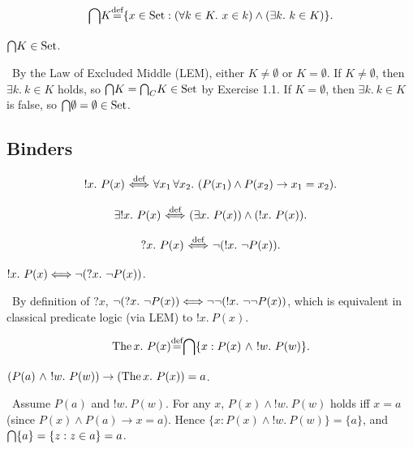 \documentclass[10pt,a4paper]{article}
\begin{document}
\begin{definition}
$${\bigcap} K {\stackrel{{\textrm{def}}}{=}} \{x \in {\textrm{Set}} : (\forall k\in K.\ x\in k)\land (\exists k.\ k\in K)\}.$$
\end{definition}

\begin{exercise}
${\bigcap} K \in {\textrm{Set}}$.
\end{exercise}
\myprf\ By the Law of Excluded Middle (LEM), either $K \neq \emptyset$ or $K = \emptyset$. If $K \neq \emptyset$, then $\exists k.\ k \in K$ holds, so ${\bigcap} K = {{\bigcap}_C} K \in {\textrm{Set}}$ by Exercise 1.1. If $K = \emptyset$, then $\exists k.\ k \in K$ is false, so ${\bigcap} \emptyset = \emptyset \in {\textrm{Set}}$. \myqed

\subsection{Binders}
\begin{definition}
$$!x.\ P(x) {\stackrel{{\textrm{def}}}{\ \Longleftrightarrow\ }} \forall x_1\, \forall x_2.\ (P(x_1)\land P(x_2)\to x_1=x_2).$$
\end{definition}

\begin{definition}
$$\exists !x.\ P(x) \propdef (\exists x.\ P(x))\land(!x.\ P(x)).$$
\end{definition}

\begin{definition}
$$?x.\ P(x) {\stackrel{{\textrm{def}}}{\ \Longleftrightarrow\ }} \neg (!x.\ \neg P(x)).$$
\end{definition}

\begin{exercise}
$!x.\ P(x) \Longleftrightarrow \neg (?x.\ \neg P(x))$.
\end{exercise}
\myprf\ By definition of $?x$, $\neg (?x.\ \neg P(x)) \LRA \neg \neg (!x.\ \neg \neg P(x))$, which is equivalent in classical predicate logic (via LEM) to $!x.\ P(x)$. \myqed

\begin{definition}
$$\The x.\ P(x) \eqdef \inter \{x : P(x)\ \land\ !w.\ P(w)\}.$$
\end{definition}

\begin{exercise}
$(P(a)\ \land\ !w.\ P(w)) \to (\The x.\ P(x))=a$.
\end{exercise}
\myprf\ Assume $P(a)$ and $!w.\ P(w)$. For any $x$, $P(x) \land !w.\ P(w)$ holds iff $x = a$ (since $P(x) \land P(a) \to x=a$). Hence $\{x : P(x) \land !w.\ P(w)\} = \{a\}$, and ${\bigcap} \{a\} = \{z : z \in a\} = a$. \myqed
\end{document}

